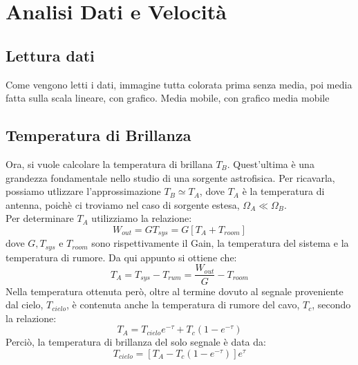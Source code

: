 \section{Analisi Dati e Velocità}
\label{Analisi Dati e Velocità}



\subsection{Lettura dati}
Come vengono letti i dati, immagine tutta colorata prima senza media, poi media fatta sulla scala lineare, con grafico. 
Media mobile, con grafico media mobile


\subsection{Temperatura di Brillanza}
Ora, si vuole calcolare la temperatura di brillana $T_{B}$. Quest'ultima è una grandezza fondamentale nello studio di una sorgente astrofisica. Per ricavarla, possiamo utlizzare l'approssimazione $T_{B} \simeq T_{A}$, dove $T_{A}$ è la temperatura di antenna, poichè ci troviamo nel caso di sorgente estesa, $\Omega_{A} \ll \Omega_{B}$.\\
Per determinare $T_{A}$ utilizziamo la relazione:
\begin{equation}
    W_{out}=GT_{sys}=G[T_{A}+T_{room}]
\end{equation}
dove $G, T_{sys}$ e $T_{room}$ sono rispettivamente il Gain, la temperatura del sistema e la temperatura di rumore.
Da qui appunto si ottiene che:
\begin{equation}
    T_{A}=T_{sys}-T_{rum}=\frac{W_{out}}{G}-T_{room} 
\label{temp antenna}
\end{equation}
Nella temperatura ottenuta però, oltre al termine dovuto al segnale proveniente dal cielo, $T_{cielo}$, è contenuta anche la temperatura di rumore del cavo, $T_{c}$, secondo la relazione:
\begin{equation}
    T_{A}=T_{cielo}e^{-\tau}+T_{c}(1-e^{-\tau})
\end{equation}
Perciò, la temperatura di brillanza del solo segnale è data da:
\begin{equation}
    T_{cielo}=[T_{A}-T_{c}(1-e^{-\tau})]e^{\tau}
\end{equation}

